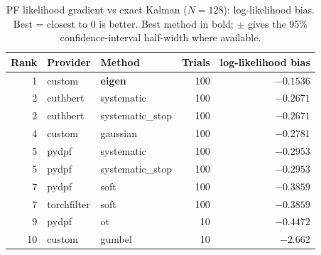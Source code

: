 \begin{table}[!htbp]
\centering
\small
\caption{PF likelihood gradient vs exact Kalman ($N=128$): log-likelihood bias. Best = closest to 0 is better. Best method in bold; $\pm$ gives the 95\% confidence-interval half-width where available.}
\label{tab:pf-likelihood-gradient-vs-exact-kalman-loglik-bias}
\begin{tabular}{rllrr}
\toprule
Rank & Provider & Method & Trials & log-likelihood bias \\
\midrule
1 & custom & \textbf{eigen} & 100 & $\mathbf{-0.1536}$ \\
2 & cuthbert & systematic & 100 & $-0.2671$ \\
2 & cuthbert & systematic\_stop & 100 & $-0.2671$ \\
4 & custom & gaussian & 100 & $-0.2781$ \\
5 & pydpf & systematic & 100 & $-0.2953$ \\
5 & pydpf & systematic\_stop & 100 & $-0.2953$ \\
7 & pydpf & soft & 100 & $-0.3859$ \\
7 & torchfilter & soft & 100 & $-0.3859$ \\
9 & pydpf & ot & 10 & $-0.4472$ \\
10 & custom & gumbel & 10 & $-2.662$ \\
\bottomrule
\end{tabular}
\end{table}
